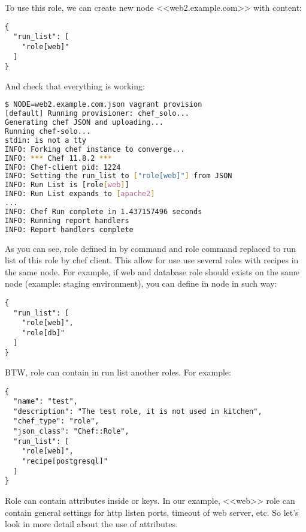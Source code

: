 To use this role, we can create new node <<web2.example.com>> with content:

\begin{lstlisting}[label=lst:my-cloud-role2,title=my-cloud/nodes/web2.example.com.json]
{
  "run_list": [
    "role[web]"
  ]
}
\end{lstlisting}

And check that everything is working:

\begin{lstlisting}[language=Bash,label=lst:my-cloud-role3]
$ NODE=web2.example.com.json vagrant provision
[default] Running provisioner: chef_solo...
Generating chef JSON and uploading...
Running chef-solo...
stdin: is not a tty
INFO: Forking chef instance to converge...
INFO: *** Chef 11.8.2 ***
INFO: Chef-client pid: 1224
INFO: Setting the run_list to ["role[web]"] from JSON
INFO: Run List is [role[web]]
INFO: Run List expands to [apache2]
...
INFO: Chef Run complete in 1.437157496 seconds
INFO: Running report handlers
INFO: Report handlers complete
\end{lstlisting}

As you can see, role defined in  by command  and role command replaced to run list of this role by chef client. This allow for use use several roles with recipes in the same node. For example, if web and database role should exists on the same node (example: staging environment), you can define  in node in such way:

\begin{lstlisting}[label=lst:my-cloud-role4,title=my-cloud/nodes/web2.example.com.json]
{
  "run_list": [
    "role[web]",
    "role[db]"
  ]
}
\end{lstlisting}

BTW, role can contain in run list another roles. For example:

\begin{lstlisting}[label=lst:my-cloud-role5,title=my-cloud/roles/test.json]
{
  "name": "test",
  "description": "The test role, it is not used in kitchen",
  "chef_type": "role",
  "json_class": "Chef::Role",
  "run_list": [
    "role[web]",
    "recipe[postgresql]"
  ]
}
\end{lstlisting}

Role can contain attributes inside  or  keys. In our example, <<web>> role can contain general settings for http listen ports, timeout of web server, etc. So let's look in more detail about the use of attributes.
